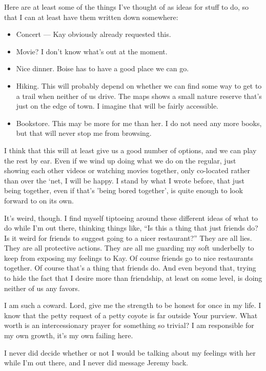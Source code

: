Here are at least some of the things I've thought of as ideas for stuff to do, so that I can at least have them written down somewhere:

\begin{itemize}
\tightlist
\item
  Concert --- Kay obviously already requested this.
\item
  Movie? I don't know what's out at the moment.
\item
  Nice dinner. Boise has to have a good place we can go.
\item
  Hiking. This will probably depend on whether we can find some way to get to a trail when neither of us drive. The maps shows a small nature reserve that's just on the edge of town. I imagine that will be fairly accessible.
\item
  Bookstore. This may be more for me than her. I do not need any more books, but that will never stop me from browsing.
\end{itemize}

I think that this will at least give us a good number of options, and we can play the rest by ear. Even if we wind up doing what we do on the regular, just showing each other videos or watching movies together, only co-located rather than over the `net, I will be happy. I stand by what I wrote before, that just being together, even if that's 'being bored together', is quite enough to look forward to on its own.

It's weird, though. I find myself tiptoeing around these different ideas of what to do while I'm out there, thinking things like, ``Is this a thing that just friends do? Is it weird for friends to suggest going to a nicer restaurant?'' They are all lies. They are all protective actions. They are all me guarding my soft underbelly to keep from exposing my feelings to Kay. Of course friends go to nice restaurants together. Of course that's a thing that friends do. And even beyond that, trying to hide the fact that I desire more than friendship, at least on some level, is doing neither of us any favors.

I am such a coward. Lord, give me the strength to be honest for once in my life. I know that the petty request of a petty coyote is far outside Your purview. What worth is an intercessionary prayer for something so trivial? I am responsible for my own growth, it's my own failing here.

I never did decide whether or not I would be talking about my feelings with her while I'm out there, and I never did message Jeremy back.

